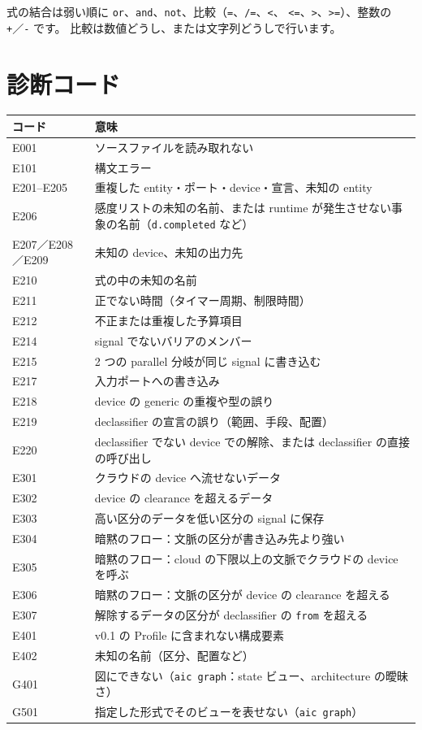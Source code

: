 \documentclass[a4paper,11pt]{ltjsarticle}
\begin{document}
式の結合は弱い順に \texttt{or}、\texttt{and}、\texttt{not}、比較（\texttt{=}、\texttt{/=}、\texttt{<}、
\texttt{<=}、\texttt{>}、\texttt{>=}）、整数の \texttt{+}／\texttt{-} です。
比較は数値どうし、または文字列どうしで行います。

\section{診断コード}

\begin{longtable}{lp{108mm}}
\toprule
コード & 意味 \\
\midrule
\endhead
E001 & ソースファイルを読み取れない \\
E101 & 構文エラー \\
E201--E205 & 重複した entity・ポート・device・宣言、未知の entity \\
E206 & 感度リストの未知の名前、または runtime が発生させない事象の名前（\texttt{d.completed} など） \\
E207／E208／E209 & 未知の device、未知の出力先 \\
E210 & 式の中の未知の名前 \\
E211 & 正でない時間（タイマー周期、制限時間） \\
E212 & 不正または重複した予算項目 \\
E214 & signal でないバリアのメンバー \\
E215 & 2 つの parallel 分岐が同じ signal に書き込む \\
E217 & 入力ポートへの書き込み \\
E218 & device の generic の重複や型の誤り \\
E219 & declassifier の宣言の誤り（範囲、手段、配置） \\
E220 & declassifier でない device での解除、または declassifier の直接の呼び出し \\
E301 & クラウドの device へ流せないデータ \\
E302 & device の clearance を超えるデータ \\
E303 & 高い区分のデータを低い区分の signal に保存 \\
E304 & 暗黙のフロー：文脈の区分が書き込み先より強い \\
E305 & 暗黙のフロー：cloud の下限以上の文脈でクラウドの device を呼ぶ \\
E306 & 暗黙のフロー：文脈の区分が device の clearance を超える \\
E307 & 解除するデータの区分が declassifier の \texttt{from} を超える \\
E401 & v0.1 の Profile に含まれない構成要素 \\
E402 & 未知の名前（区分、配置など） \\
G401 & 図にできない（\texttt{aic graph}：state ビュー、architecture の曖昧さ） \\
G501 & 指定した形式でそのビューを表せない（\texttt{aic graph}） \\
\bottomrule
\end{longtable}
\end{document}

